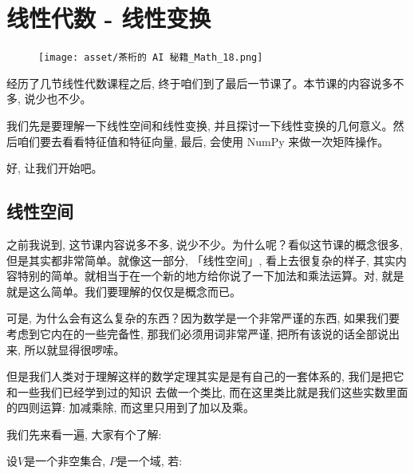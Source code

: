 \chapter{线性代数 - 线性变换}

\begin{figure}[ht]
  \centering
  \texttt{[image: asset/茶桁的 AI 秘籍\_Math\_18.png]}
\end{figure}

\newpage

经历了几节线性代数课程之后, 终于咱们到了最后一节课了。本节课的内容说多不多, 说少也不少。

我们先是要理解一下线性空间和线性变换, 并且探讨一下线性变换的几何意义。然后咱们要去看看特征值和特征向量, 最后, 会使用 NumPy 来做一次矩阵操作。

好, 让我们开始吧。

\section{线性空间}

之前我说到, 这节课内容说多不多, 说少不少。为什么呢？看似这节课的概念很多, 但是其实都非常简单。就像这一部分, 「线性空间」,  看上去很复杂的样子, 其实内容特别的简单。就相当于在一个新的地方给你说了一下加法和乘法运算。对, 就是就是这么简单。我们要理解的仅仅是概念而已。

可是, 为什么会有这么复杂的东西？因为数学是一个非常严谨的东西, 如果我们要考虑到它内在的一些完备性, 那我们必须用词非常严谨, 把所有该说的话全部说出来, 所以就显得很啰嗦。

但是我们人类对于理解这样的数学定理其实是是有自己的一套体系的, 我们是把它和一些我们已经学到过的知识
去做一个类比, 而在这里类比就是我们这些实数里面的四则运算: 加减乘除, 而这里只用到了加以及乘。


我们先来看一遍, 大家有个了解: 

设$V$是一个非空集合, $P$是一个域, 若: 


